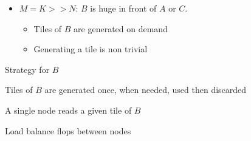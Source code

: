 \begin{frame}[t]
\begin{columns}
\begin{column}{0.5\textwidth}
{\begin{tikzpicture}
    \end{tikzpicture}}
    \end{column}

    \begin{column}{.4\textwidth}
      \begin{itemize}
      \item $M = K >> N$: $B$ is huge in front of $A$ or $C$.
        \begin{itemize}
        \item Tiles of $B$ are generated on demand
        \item Generating a tile is non trivial
        \end{itemize}
      \end{itemize}

      \begin{exampleblock}{Strategy for $B$}
        \begin{center}
          Tiles of $B$ are generated once, when needed, used then discarded
          
          A single node reads a given tile of $B$

          Load balance flops between nodes
        \end{center}
      \end{exampleblock}
    \end{column}
    \end{columns}
  
\end{frame}

